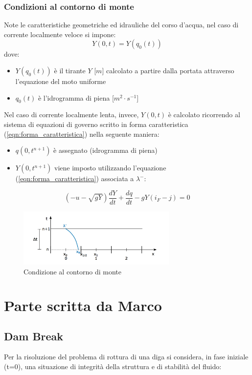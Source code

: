\documentclass[12pt]{article} %
\begin{document}
\subsubsection{Condizioni al contorno di monte}
\noindent Note le caratteristiche geometriche ed idrauliche del corso d'acqua, nel caso di corrente localmente veloce si impone:
\begin{equation}
    Y(0,t)=Y(q_0(t))
\end{equation}
\noindent dove:
\begin{itemize}
    \item $Y(q_0(t))$ è il tirante $Y$ [$m$] calcolato a partire dalla portata attraverso l'equazione del moto uniforme
    \item $q_0(t)$ è l'idrogramma di piena [$m^2\cdot s^{-1}$]
\end{itemize}
\noindent Nel caso di corrente localmente lenta, invece, $Y(0,t)$ è calcolato ricorrendo al sistema di equazioni di governo scritto in forma caratteristica (\ref{eqn:forma_caratteristica}) nella seguente maniera:
\begin{itemize}
    \item $q(0,t^{n+1})$ è assegnato (idrogramma di piena)
    \item $Y(0,t^{n+1})$ viene imposto utilizzando l'equazione (\ref{eqn:forma_caratteristica}) associata a $\lambda^-$:
\end{itemize}
\begin{equation}
    \left(-u-\sqrt{gY}\right)\frac{dY}{dt}+\frac{dq}{dt}-gY\left(i_F-j\right)=0
\end{equation}
\begin{figure}
    \centering
    \includegraphics[width=0.7\textwidth]{Piede xR.png}
    \caption{Condizione al contorno di monte}
    \label{fig:piede xR}
\end{figure}



\section{Parte scritta da Marco}
\subsection{Dam Break}
\noindent Per la risoluzione del problema di rottura di una diga si considera, in fase iniziale (t=0), una situazione di integrità della struttura e di stabilità del fluido:
\end{document}
